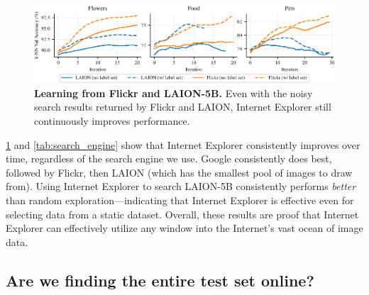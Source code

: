 \begin{figure}
    \centering
    \includegraphics[width=\linewidth]{figures/laion-curves.pdf}
    \caption{\textbf{Learning from Flickr and LAION-5B.} Even with the noisy search results returned by Flickr and LAION, Internet Explorer still continuously improves performance. }
    \label{fig:other_data_curves}
\end{figure}


\cref{fig:other_data_curves} and \cref{tab:search_engine} show that Internet Explorer consistently improves over time, regardless of the search engine we use. 
Google consistently does best, followed by Flickr, then LAION (which has the smallest pool of images to draw from).
Using Internet Explorer to search LAION-5B consistently performs \textit{better} than random exploration---indicating that Internet Explorer is effective even for selecting data from a static dataset.
Overall, these results are proof that Internet Explorer can effectively utilize any window into the Internet's vast ocean of image data. 


\subsection{Are we finding the entire test set online?}
\label{sec:finding_test_set_online}

